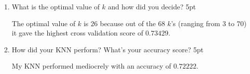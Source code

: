 \documentclass[12pt]{article}
\begin{document}
\begin{enumerate}[(1)]
\begin{mdframed}
    \end{mdframed}
    \item What is the optimal value of $k$ and how did you decide? 5pt
    \begin{mdframed}
        The optimal value of $k$ is $26$ because out of the 68 $k$'s (ranging from 3 to 70) it gave the highest cross validation score of $0.73429$.
    \end{mdframed}
    \item How did your KNN perform? What's your accuracy score? 5pt
    \begin{mdframed}
        My KNN performed mediocrely with an accuracy of $0.72222$.
    \end{mdframed}
\end{enumerate}

% 
\end{document}
